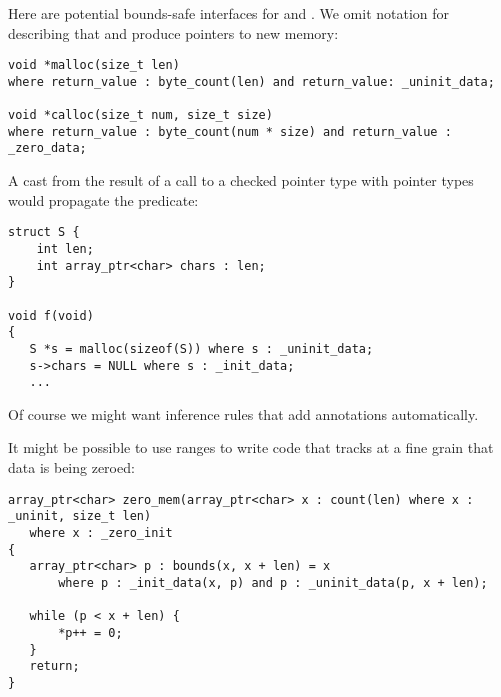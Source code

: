 Here are potential bounds-safe interfaces for  and .
We omit notation for describing that  and  produce 
pointers to new memory:
\begin{lstlisting}
void *malloc(size_t len) 
where return_value : byte_count(len) and return_value: _uninit_data;

void *calloc(size_t num, size_t size)
where return_value : byte_count(num * size) and return_value : _zero_data;
\end{lstlisting}
A cast from the result of a  call to a checked pointer type with pointer types
would propagate the   predicate:
\begin{lstlisting}
struct S {
    int len;
    int array_ptr<char> chars : len;
}

void f(void) 
{
   S *s = malloc(sizeof(S)) where s : _uninit_data;
   s->chars = NULL where s : _init_data;
   ...
\end{lstlisting}
Of course we might want inference rules that add annotations automatically.  

It might be possible to use ranges to write code that tracks at a fine grain that 
data is being zeroed:
\begin{lstlisting}
array_ptr<char> zero_mem(array_ptr<char> x : count(len) where x : _uninit, size_t len) 
   where x : _zero_init
{
   array_ptr<char> p : bounds(x, x + len) = x
       where p : _init_data(x, p) and p : _uninit_data(p, x + len);
       
   while (p < x + len) { 
       *p++ = 0;
   }
   return;
}
\end{lstlisting}
